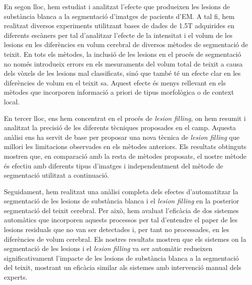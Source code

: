 En segon lloc, hem estudiat i analitzat l'efecte que produeixen les lesions de substància blanca a la segmentació d'imatges de pacients d'EM. A tal fi, hem realitzat diversos experiments utilitzant bases de dades de 1.5T adquirides en diferents escàners per tal d'analitzar l'efecte de la intensitat i el volum de les lesions en les diferències en volum cerebral de diversos mètodes de segmentació de teixit. En tots els mètodes, la inclusió de les lesions en el procés de segmentació no només  introdueix errors en els mesuraments del volum total de teixit a causa dels vòxels de les lesions mal classificats, sinó que també té un efecte clar en les diferències de volum en el teixit sa. Aquest efecte és menys rellevant en els mètodes que incorporen informació a priori de tipus morfològica o de context local.

En tercer lloc, ens hem concentrat en el procés de \textit{lesion filling}, on hem resumit i analitzat la precisió de les diferents tècniques proposades en el camp. Aquesta anàlisi ens ha servit de base per proposar una nova tècnica de \textit{lesion filling} que millori les limitacions observades en els mètodes anteriors. Els resultats obtinguts mostren que, en comparació amb la resta de mètodes proposats, el nostre mètode és efectiu amb diferents tipus d'imatges i independentment del mètode de segmentació utilitzat a continuació.

Seguidament, hem realitzat una anàlisi completa dels efectes d'automatitzar la segmentació de les lesions de substància blanca i el \textit{lesion filling}
en la posterior segmentació del teixit cerebral. Per això, hem avaluat l'eficàcia de dos sistemes automàtics que incorporen aquests processos per tal d'entendre el paper de les lesions residuals que no van ser detectades i, per tant no processades, en les diferències de volum cerebral. Els nostres resultats mostren que els sistemes on la segmentació de les lesions i el \textit{lesion filling} va ser automàtic redueixen significativament l'impacte de les lesions de substància blanca a la segmentació del teixit, mostrant un eficàcia similar als sistemes amb intervenció manual dels experts.

